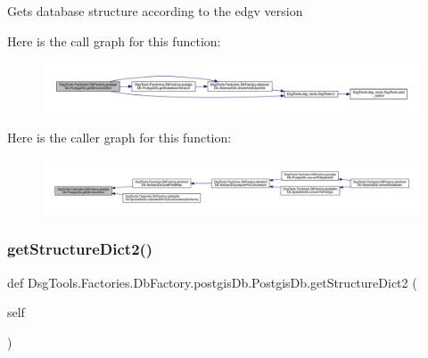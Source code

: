 \begin{DoxyVerb}Gets database structure according to the edgv version
\end{DoxyVerb}
 Here is the call graph for this function\+:
\nopagebreak
\begin{figure}[H]
\begin{center}
\leavevmode
\includegraphics[width=350pt]{class_dsg_tools_1_1_factories_1_1_db_factory_1_1postgis_db_1_1_postgis_db_ae29ae632868ad2dbd4e57494af7f6e08_cgraph}
\end{center}
\end{figure}
Here is the caller graph for this function\+:
\nopagebreak
\begin{figure}[H]
\begin{center}
\leavevmode
\includegraphics[width=350pt]{class_dsg_tools_1_1_factories_1_1_db_factory_1_1postgis_db_1_1_postgis_db_ae29ae632868ad2dbd4e57494af7f6e08_icgraph}
\end{center}
\end{figure}
\mbox{\label{class_dsg_tools_1_1_factories_1_1_db_factory_1_1postgis_db_1_1_postgis_db_a9539edb8eb6713fa788cb4d7c931778c}} 
\subsubsection{\texorpdfstring{get\+Structure\+Dict2()}{getStructureDict2()}}
{\footnotesize\ttfamily def Dsg\+Tools.\+Factories.\+Db\+Factory.\+postgis\+Db.\+Postgis\+Db.\+get\+Structure\+Dict2 (\begin{DoxyParamCaption}\item[{}]{self }\end{DoxyParamCaption})}

